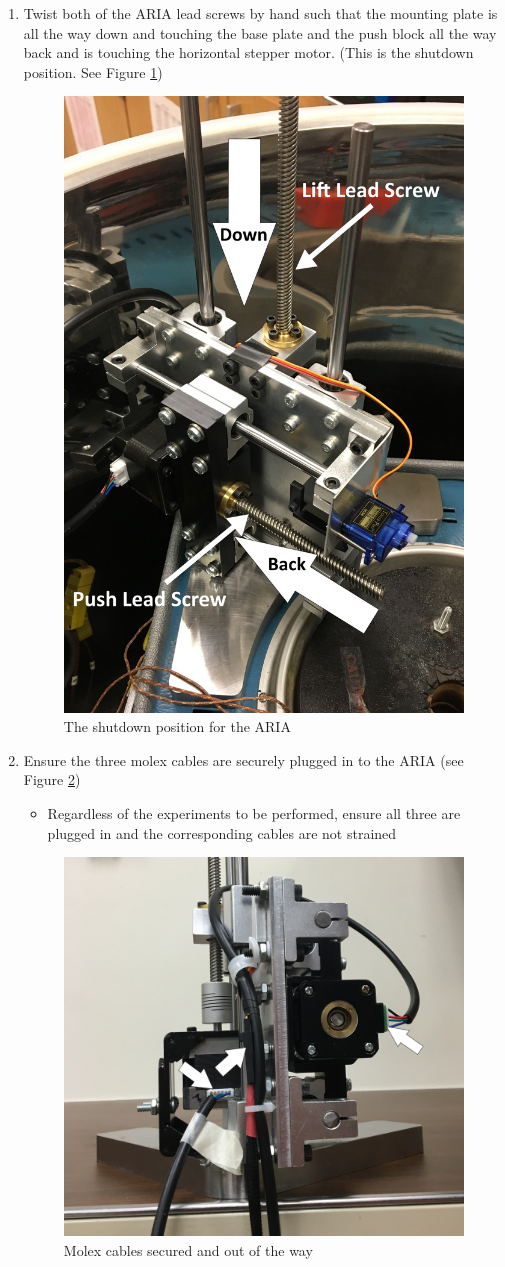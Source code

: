 \documentclass[letterpaper,11pt]{article}
\begin{document}
\begin{enumerate}
    \item Twist both of the ARIA lead screws by hand such that the mounting 
        plate is all the way down and touching the base plate and the push block
        all the way back and is touching the horizontal stepper motor. (This is 
        the shutdown position. See Figure \ref{fig:shutdown_position})

\begin{figure}[H]
\centering\includegraphics[width=.3\textwidth]{shutdown_position.jpg}
\caption{The shutdown position for the ARIA}
\label{fig:shutdown_position}
\end{figure}

    \item Ensure the three molex cables are securely plugged in to the ARIA 
        (see Figure \ref{fig:Molex_cables})
        \begin{itemize}
        \item Regardless of the experiments to be performed, ensure all three 
            are plugged in and the corresponding cables are not strained
        \end{itemize}
        
\begin{figure}[H]
\centering\includegraphics[width=.5\textwidth]{Molex_cables.jpg}
\caption{Molex cables secured and out of the way}
\label{fig:Molex_cables}
\end{figure}
    


\end{enumerate}
\end{document}
